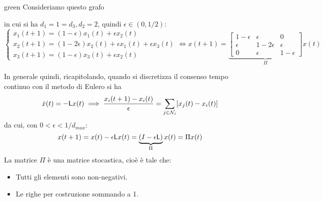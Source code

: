 \begin{mybox}{green}{}
Consideriamo questo grafo
\label{exmp:cons}
\begin{center}
\end{center}
in cui si ha $d_1=1 = d_3, d_2 = 2$, quindi $\epsilon \in (0, 1/2)$:
\begin{equation*}
\begin{cases}
x_1(t+1) = (1-\epsilon)x_1(t) + \epsilon x_2(t) \\
x_2(t+1) = (1 - 2\epsilon)x_2(t) + \epsilon x_1(t) + \epsilon x_3(t) \\
x_3(t+1) = (1 -\epsilon)x_3(t) + \epsilon x_2(t)
\end{cases} \iff x(t+1) = \underbrace{\begin{bmatrix} 1 - \epsilon & \epsilon & 0 \\
\epsilon & 1 -2\epsilon & \epsilon \\
0 & \epsilon & 1-\epsilon
\end{bmatrix}}_{\Pi} x(t)
\end{equation*}
\end{mybox}

In generale quindi, ricapitolando, quando si discretizza il consenso tempo continuo con il metodo di Eulero si ha
\begin{equation}
\dot{x}(t) = -\mathsf{L} x(t) \implies \frac{x_i(t+1) - x_i(t)}{\epsilon} = \sum_{j \in \mathcal{N}_i} [x_j(t) - x_i(t)]
\end{equation} da cui, con $0 < \epsilon < 1/d_{max}$:
\begin{equation}
x(t+1) = x(t) - \epsilon \mathsf{L} x(t) = \underbrace{(I - \epsilon \mathsf{L} )}_{\Pi} x(t) = \Pi x(t)
\end{equation}
La matrice $\Pi$ \`e una matrice stocastica, cio\`e \`e tale che:
\begin{itemize}
\item Tutti gli elementi sono non-negativi.
\item Le righe per costruzione sommando a 1.
\end{itemize}

